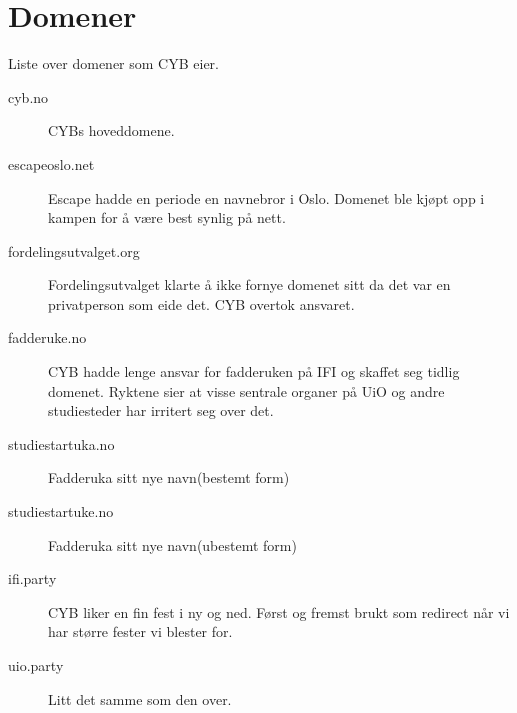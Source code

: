 \chapter*{Domener}

Liste over domener som CYB eier.

\begin{description}
	\item[cyb.no] CYBs hoveddomene. 
	\item[escapeoslo.net] Escape hadde en periode en navnebror i Oslo. Domenet ble kjøpt opp i kampen for å være best synlig på nett.
	\item[fordelingsutvalget.org] Fordelingsutvalget klarte å ikke fornye domenet sitt da det var en privatperson som eide det. CYB overtok ansvaret.
	\item[fadderuke.no] CYB hadde lenge ansvar for fadderuken på IFI og skaffet seg tidlig domenet. Ryktene sier at visse sentrale organer på UiO og andre studiesteder har irritert seg over det.
	\item[studiestartuka.no] Fadderuka sitt nye navn(bestemt form)
	\item[studiestartuke.no] Fadderuka sitt nye navn(ubestemt form)
	\item[ifi.party] CYB liker en fin fest i ny og ned. Først og fremst brukt som redirect når vi har større fester vi blester for.
	\item[uio.party] Litt det samme som den over.
\end{description}
